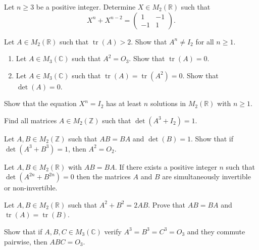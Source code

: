 \documentclass[12pt]{article}
\begin{document}
\begin{problem}
Let $n\ge 3$ be a positive integer. Determine $X\in M_2(\mathbb{R})$ such that
\[
X^n+X^{n-2} = \begin{pmatrix}1 & -1\\ -1 & 1\end{pmatrix}.
\]
\end{problem}

\begin{problem}
Let $A\in M_2(\mathbb{R})$ such that $\operatorname{tr}(A)>2$. Show that $A^n\ne I_2$ for all $n\ge 1$.
\end{problem}

\begin{problem}
\begin{enumerate}[label=(\alph*)]
\item Let $A\in M_3(\mathbb{C})$ such that $A^2=O_3$. Show that $\operatorname{tr}(A)=0$.
\item Let $A\in M_3(\mathbb{C})$ such that $\operatorname{tr}(A)=\operatorname{tr}(A^2)=0$. Show that $\det(A)=0$.
\end{enumerate}
\end{problem}

\begin{problem}
Show that the equation $X^n=I_2$ has at least $n$ solutions in $M_2(\mathbb{R})$ with $n\ge 1$.
\end{problem}

\begin{problem}
Find all matrices $A\in M_2(\mathbb{Z})$ such that $\det(A^3+I_2)=1$.
\end{problem}

\begin{problem}
Let $A,B\in M_2(\mathbb{Z})$ such that $AB=BA$ and $\det(B)=1$. Show that if $\det(A^3+B^3)=1$, then $A^2=O_2$.
\end{problem}

\begin{problem}
Let $A,B\in M_2(\mathbb{R})$ with $AB=BA$. If there exists a positive integer $n$ such that $\det(A^{2n}+B^{2n})=0$ then the matrices $A$ and $B$ are simultaneously invertible or non-invertible.
\end{problem}

\begin{problem}
Let $A,B\in M_2(\mathbb{R})$ such that $A^2+B^2=2AB$. Prove that $AB=BA$ and $\operatorname{tr}(A)=\operatorname{tr}(B)$.
\end{problem}

\begin{problem}
Show that if $A,B,C\in M_3(\mathbb{C})$ verify $A^3=B^3=C^3=O_3$ and they commute pairwise, then $ABC=O_3$.
\end{problem}
\end{document}
